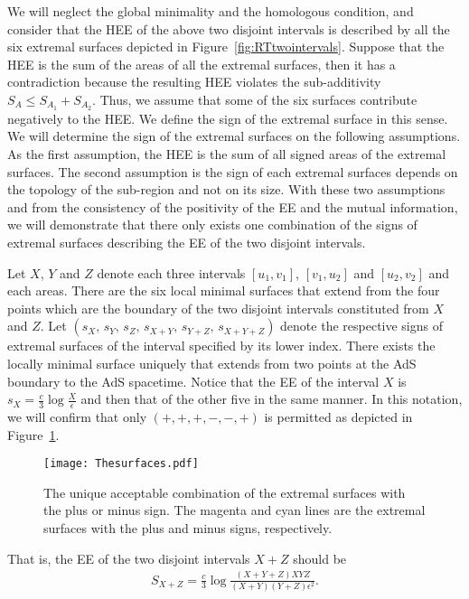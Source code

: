 \documentclass[%
 reprint,
 amsmath,amssymb,
 aps,
]{revtex4-2}
\begin{document}
    We will neglect the global minimality and the homologous condition, and consider that the HEE of the above two disjoint intervals is described by all the six extremal surfaces depicted in Figure~\ref{fig:RTtwointervals}. Suppose that the HEE is the sum of the areas of all the extremal surfaces, then it has a contradiction because the resulting HEE violates the sub-additivity $S_{A} \le S_{A_1}+S_{A_2}$. Thus, we assume that some of the six surfaces contribute negatively to the HEE. We define the sign of the extremal surface in this sense. We will determine the sign of the extremal surfaces on the following assumptions. As the first assumption, the HEE is the sum of all signed areas of the extremal surfaces. The second assumption is the sign of each extremal surfaces depends on the topology of the sub-region and not on its size. With these two assumptions and from the consistency of the positivity of the EE and the mutual information, we will demonstrate that there only exists one combination of the signs of extremal surfaces describing the EE of the two disjoint intervals. 
    
    
    Let $X$, $Y$ and $Z$ denote each three intervals $[u_1,v_1]$, $[v_1,u_2]$ and $[u_2,v_2]$ and each areas. There are the six local minimal surfaces that extend from the four points which are the boundary of the two disjoint intervals constituted from $X$ and $Z$. Let $(s_{X},\,s_{Y},\,s_{Z},\,s_{X+Y},\,s_{Y+Z},\,s_{X+Y+Z})$ denote the respective signs of extremal surfaces of the interval specified by its lower index. There exists the locally minimal surface uniquely that extends from two points at the AdS boundary to the AdS spacetime. Notice that the EE of the interval $X$ is $s_X = \frac{c}{3}\log{\frac{X}{\epsilon}}$ and then that of the other five in the same manner. In this notation, we will confirm that only $(+,+,+,-,-,+)$ is permitted as depicted in Figure~\ref{fig:Thesurfaces}.
\begin{figure}[t]
    \texttt{[image: Thesurfaces.pdf]}
    \caption{\label{fig:Thesurfaces} The unique acceptable combination of the extremal surfaces with the plus or minus sign. The magenta and cyan lines are the extremal surfaces with the plus and minus signs, respectively. }
\end{figure}
    That is, the EE of the two disjoint intervals $X+Z$ should be
\begin{align}\label{eq:X+Z}
    S_{X+Z} = \frac{c}{3} \log \frac{(X+Y+Z)XYZ}{(X+Y)(Y+Z)\epsilon^2}.
\end{align}
\end{document}
